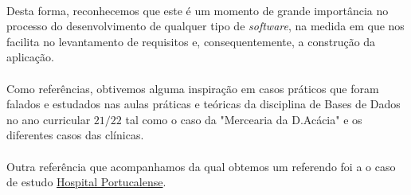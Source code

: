 \documentclass[a4paper,12pt]{scrreprt}
\begin{document}
    \paragraph{}
    Desta forma, reconhecemos que este é um momento de grande importância no processo do desenvolvimento de qualquer tipo de \textit{software}, na medida em que nos facilita no levantamento de requisitos e, consequentemente, a construção da aplicação.
    


\renewcommand\bibname{Referências}

\begin{thebibliography}{9}
    \paragraph{}
    Como referências, obtivemos alguma inspiração em casos práticos que foram falados e estudados nas aulas práticas e teóricas da disciplina de Bases de Dados no ano curricular $21/22$ tal como o caso da "Mercearia da D.Acácia" e os diferentes casos das clínicas.
    \paragraph{}
    Outra referência que acompanhamos da qual obtemos um referendo foi a o caso de estudo \hyperlink{https://github.com/dianazevedoferreira/UM_BD_2022/blob/main/PL01/BD-PL1.pdf}{Hospital Portucalense}.
\end{thebibliography}



    
\end{document}
